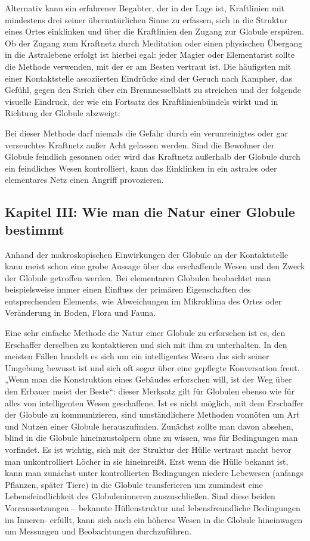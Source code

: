 \documentclass[a5paper,8pt]{book}
\begin{document}
Alternativ kann ein erfahrener Begabter, der in der Lage ist, Kraftlinien mit mindestens drei seiner übernatürlichen Sinne 
zu erfassen, sich in die Struktur eines Ortes einklinken und über die Kraftlinien den Zugang zur Globule erspüren. Ob der 
Zugang zum Kraftnetz durch Meditation oder einen physischen Übergang in die Astralebene erfolgt ist hierbei egal: jeder 
Magier oder Elementarist sollte die Methode verwenden, mit der er am Besten vertraut ist. Die häufigsten mit einer 
Kontaktstelle assoziierten Eindrücke sind der Geruch nach Kampher, das Gefühl, gegen den Strich über ein Brennnesselblatt 
zu streichen und der folgende visuelle Eindruck, der wie ein Fortsatz des Kraftlinienbündels wirkt und in Richtung der 
Globule abzweigt:

Bei dieser Methode darf niemals die Gefahr durch ein verunreinigtes oder gar verseuchtes Kraftnetz außer Acht gelassen 
werden. Sind die Bewohner der Globule feindlich gesonnen oder wird das Kraftnetz außerhalb der Globule durch ein 
feindliches Wesen kontrolliert, kann das Einklinken in ein astrales oder elementares Netz einen Angriff provozieren. 

\subsection {Kapitel III: Wie man die Natur einer Globule bestimmt}

Anhand der makroskopischen Einwirkungen der Globule an der Kontaktstelle kann meist schon eine grobe Aussage über das 
erschaffende Wesen und den Zweck der Globule getroffen werden. Bei elementaren Globulen beobachtet man beispielsweise 
immer einen Einfluss der primären Eigenschaften des entsprechenden Elements, wie Abweichungen im Mikroklima des Ortes oder 
Veränderung in Boden, Flora und Fauna. 

Eine sehr einfache Methode die Natur einer Globule zu erforschen ist es, den Erschaffer derselben zu kontaktieren und sich
mit ihm zu unterhalten. In den meisten Fällen handelt es sich um ein intelligentes Wesen das sich seiner Umgebung bewusst 
ist und sich oft sogar über eine gepflegte Konversation freut. „Wenn man die Konstruktion eines Gebäudes erforschen will, 
ist der Weg über den Erbauer meist der Beste“: dieser Merksatz gilt für Globulen ebenso wie für alles von intelligenten 
Wesen geschaffene. 
Ist es nicht möglich, mit dem Erschaffer der Globule zu kommunizieren, sind umständlichere Methoden vonnöten um Art und 
Nutzen einer Globule herauszufinden. Zunächst sollte man davon absehen, blind in die Globule hineinzustolpern ohne zu 
wissen, was für Bedingungen man vorfindet. Es ist wichtig, sich mit der Struktur der Hülle vertraut macht bevor man 
unkontrolliert Löcher in sie hineinreißt. Erst wenn die Hülle bekannt ist, kann man zunächst unter kontrollierten 
Bedingungen niedere Lebewesen (anfangs Pflanzen, später Tiere) in die Globule transferieren um zumindest eine 
Lebensfeindlichkeit des Globuleninneren auszuschließen. Sind diese beiden Vorraussetzungen – bekannte Hüllenstruktur und 
lebensfreundliche Bedingungen im Inneren-  erfüllt, kann sich auch ein höheres Wesen in die Globule hineinwagen um 
Messungen und Beobachtungen durchzuführen. 
\end{document}
